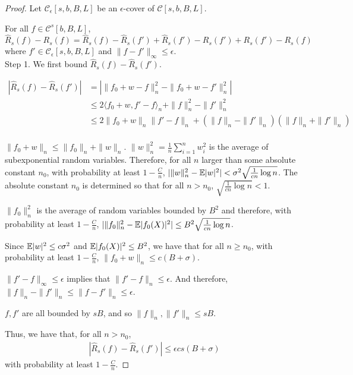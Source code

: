 \begin{proof}

Let $\mathcal{C}_\epsilon[s,b,B,L]$ be an $\epsilon$-cover of $\mathcal{C}[s,b,B,L]$. 

For all $f \in \mathcal{C}^s[b,B,L]$,
\[
\hat{R}_s(f) - R_s(f) = \hat{R}_s(f) - \hat{R}_s(f') + \hat{R}_s(f') - R_s(f') + R_s(f') - R_s(f)
\]
where $f' \in \mathcal{C}_\epsilon[s,b,B,L]$ and $\| f - f' \|_\infty \leq \epsilon$.\\

Step 1. We first bound $\hat{R}_s(f) - \hat{R}_s(f')$.

\begin{align*}
|\hat{R}_s(f) - \hat{R}_s(f')| &= |\| f_0 + w - f \|_n^2 - \| f_0 + w - f' \|_n^2| \\
	&\leq 2 \langle f_0 + w , f' - f \rangle_n + \| f \|_n^2 - \| f' \|_n^2\\
	&\leq 2 \| f_0 + w \|_n \| f' - f \|_n + ( \| f \|_n - \|f'\|_n)( \| f \|_n + \|f'\|_n)\\
\end{align*}

$\| f_0 + w \|_n \leq \| f_0 \|_n + \|w \|_n$. $\| w \|^2_n = \frac{1}{n}\sum_{i=1}^n w_i^2$ is the average of subexponential random variables. Therefore, for all $n$ larger than some absolute constant $n_0$, with probability at least $1-\frac{C}{n}$, $|\|w\|^2_n - {\mathbb E}|w|^2 | < \sigma^2 \sqrt{\frac{1}{cn} \log n}$. The absolute constant $n_0$ is determined so that for all $n > n_0$, $\sqrt{\frac{1}{cn} \log n} < 1$. 

$\|f_0\|^2_n$ is the average of random variables bounded by $B^2$ and therefore, with probability at least $1-\frac{C}{n}$, $|\| f_0 \|^2_n - {\mathbb E} |f_0(X)|^2 | \leq B^2\sqrt{ \frac{1}{cn} \log n}$.

Since ${\mathbb E}|w|^2 \leq c\sigma^2$ and ${\mathbb E}| f_0(X)|^2 \leq B^2$, we have that for all $n \geq n_0$, with probability at least $1-\frac{C}{n}$, $\| f_0 + w \|_n \leq c(B+\sigma)$.

$\| f' - f \|_\infty \leq \epsilon$ implies that $\| f' - f\|_n \leq \epsilon$. And therefore, $\| f \|_n - \|f'\|_n \leq \| f - f' \|_n \leq \epsilon$. 

$f,f'$ are all bounded by $sB$, and so $\|f \|_n, \| f' \|_n \leq sB$.

Thus, we have that, for all $n > n_0$,
\begin{align}
|\hat{R}_s(f) - \hat{R}_s(f')| \leq \epsilon cs(B + \sigma) \label{eqn:approx_deviation1}
\end{align}
with probability at least $1-\frac{C}{n}$.


\end{proof}

